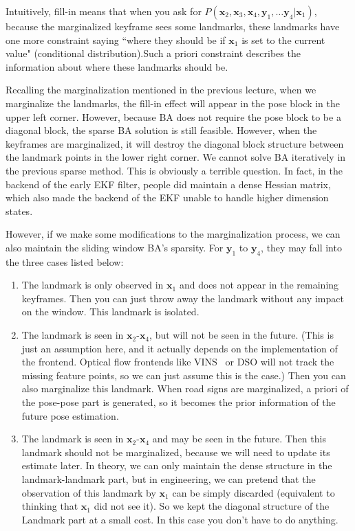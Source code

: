 Intuitively, fill-in means that when you ask for $P(\bm{x}_2, \bm{x}_3, \bm{x}_4, \bm{y}_1, \ldots \bm{y}_4|\bm{x}_1)$, because the marginalized keyframe sees some landmarks, these landmarks have one more constraint saying ``where they should be if $\bm{x}_1$ is set to the current value" (conditional distribution).Such a priori constraint describes the information about where these landmarks should be.

Recalling the marginalization mentioned in the previous lecture, when we marginalize the landmarks, the fill-in effect will appear in the pose block in the upper left corner. However, because BA does not require the pose block to be a diagonal block, the sparse BA solution is still feasible. However, when the keyframes are marginalized, it will destroy the diagonal block structure between the landmark points in the lower right corner. We cannot solve BA iteratively in the previous sparse method. This is obviously a terrible question. In fact, in the backend of the early EKF filter, people did maintain a dense Hessian matrix, which also made the backend of the EKF unable to handle higher dimension states.

However, if we make some modifications to the marginalization process, we can also maintain the sliding window BA's sparsity. For $\bm{y}_1$ to $\bm{y}_4$, they may fall into the three cases listed below:

\begin{enumerate}
	\item The landmark is only observed in $\bm{x}_1$ and does not appear in the remaining keyframes. Then you can just throw away the landmark without any impact on the window. This landmark is isolated.
	\item The landmark is seen in $\bm{x}_2$-$\bm{x}_4$, but will not be seen in the future. (This is just an assumption here, and it actually depends on the implementation of the frontend. Optical flow frontends like VINS~\cite{Qin2018} or DSO will not track the missing feature points, so we can just assume this is the case.) Then you can also marginalize this landmark. When road signs are marginalized, a priori of the pose-pose part is generated, so it becomes the prior information of the future pose estimation.
	\item The landmark is seen in $\bm{x}_2$-$\bm{x}_4$ and may be seen in the future. Then this landmark should not be marginalized, because we will need to update its estimate later. In theory, we can only maintain the dense structure in the landmark-landmark part, but in engineering, we can pretend that the observation of this landmark by $\bm{x}_1$ can be simply discarded (equivalent to thinking that $\bm{x}_1$ did not see it). So we kept the diagonal structure of the Landmark part at a small cost. In this case you don't have to do anything.
\end{enumerate}


